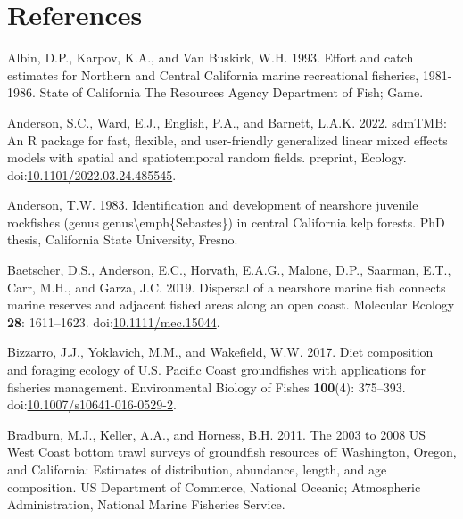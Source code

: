 \documentclass[11pt,
  english,
  letterpaper,
]{article}
\newlength{\cslhangindent}
\newenvironment{CSLReferences}[2] %
 {%
  \setlength{\parindent}{0pt}
  \ifodd #1 \everypar{\setlength{\hangindent}{\cslhangindent}}\ignorespaces\fi
  \ifnum #2 > 0
  \setlength{\parskip}{#2\baselineskip}
  \fi
 }%
 {}
\begin{document}
\hypertarget{references}{%
\section{References}\label{references}}

\hypertarget{refs}{}
\begin{CSLReferences}{1}{0}
\leavevmode{}%
Albin, D.P., Karpov, K.A., and Van Buskirk, W.H. 1993. Effort and catch estimates for {Northern} and {Central} {California} marine recreational fisheries, 1981-1986. State of California The Resources Agency Department of Fish; Game.

\leavevmode{}%
Anderson, S.C., Ward, E.J., English, P.A., and Barnett, L.A.K. 2022. {sdmTMB}: An {R} package for fast, flexible, and user-friendly generalized linear mixed effects models with spatial and spatiotemporal random fields. preprint, Ecology. doi:\href{https://doi.org/10.1101/2022.03.24.485545}{10.1101/2022.03.24.485545}.

\leavevmode{}%
Anderson, T.W. 1983. Identification and development of nearshore juvenile rockfishes (genus genus{\textbackslash{}}emph\{{Sebastes}\}) in central {California} kelp forests. PhD thesis, California State University, Fresno.

\leavevmode{}%
Baetscher, D.S., Anderson, E.C., Horvath, E.A.G., Malone, D.P., Saarman, E.T., Carr, M.H., and Garza, J.C. 2019. Dispersal of a nearshore marine fish connects marine reserves and adjacent fished areas along an open coast. Molecular Ecology \textbf{28}: 1611--1623. doi:\href{https://doi.org/10.1111/mec.15044}{10.1111/mec.15044}.

\leavevmode{}%
Bizzarro, J.J., Yoklavich, M.M., and Wakefield, W.W. 2017. Diet composition and foraging ecology of {U}.{S}. {Pacific} {Coast} groundfishes with applications for fisheries management. Environmental Biology of Fishes \textbf{100}(4): 375--393. doi:\href{https://doi.org/10.1007/s10641-016-0529-2}{10.1007/s10641-016-0529-2}.

\leavevmode{}%
Bradburn, M.J., Keller, A.A., and Horness, B.H. 2011. The 2003 to 2008 {US} {West} {Coast} bottom trawl surveys of groundfish resources off {Washington}, {Oregon}, and {California}: Estimates of distribution, abundance, length, and age composition. US Department of Commerce, National Oceanic; Atmospheric Administration, National Marine Fisheries Service.


\end{CSLReferences}
\end{document}
